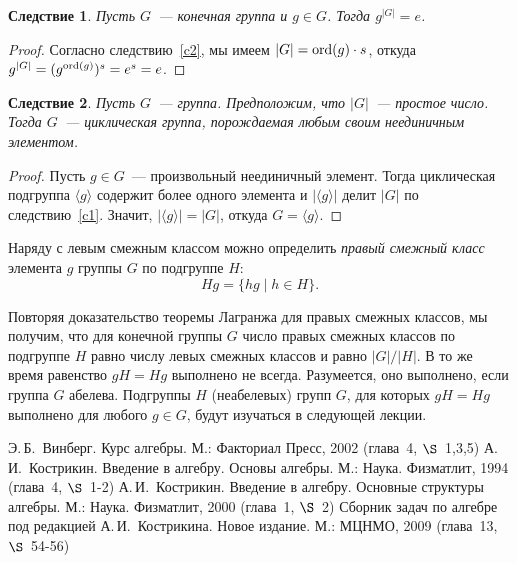 \documentclass[a4paper,10pt]{amsart}
\def\ord{{\rm ord}}%
\def\ord{{\rm ord}}
\def\ord{{\rm ord}}
\newtheorem{corollary}{Следствие}
\theoremstyle{definition}
\theoremstyle{remark}
\begin{document}
\begin{corollary} \label{c3}
Пусть $G$~--- конечная группа и $g\in G$. Тогда $g^{|G|}=e$.
\end{corollary}

\begin{proof}
Согласно следствию~\ref{c2}, мы имеем $|G|=\ord(g) \cdot s$, откуда
$g^{|G|}=(g^{\ord(g)})^s=e^s=e$.
\end{proof}

\begin{corollary} \label{c5}
Пусть $G$~--- группа. Предположим, что $|G|$~--- простое число.
Тогда $G$~--- циклическая группа, порождаемая любым своим
неединичным элементом.
\end{corollary}

\begin{proof}
Пусть $g\in G$~--- произвольный неединичный элемент. Тогда
циклическая подгруппа $\langle g\rangle$ содержит более одного
элемента и $|\langle g\rangle|$ делит $|G|$ по следствию~\ref{c1}.
Значит, $|\langle g\rangle|=|G|$, откуда $G=\langle g\rangle$.
\end{proof}

Наряду с левым смежным классом можно определить {\it правый смежный
класс} элемента $g$ группы $G$ по подгруппе $H$:
$$
Hg=\{hg \mid h\in H\}.
$$

Повторяя доказательство теоремы Лагранжа для правых смежных классов,
мы получим, что для конечной группы $G$ число правых смежных классов
по подгруппе $H$ равно числу левых смежных классов и равно
$|G|/|H|$. В то же время равенство $gH=Hg$ выполнено не всегда.
Разумеется, оно выполнено, если группа $G$ абелева. Подгруппы $H$
(неабелевых) групп $G$, для которых $gH=Hg$ выполнено для любого
$g\in G$, будут изучаться в следующей лекции.

\bigskip

\begin{thebibliography}{99}
Э.\,Б.~Винберг. Курс алгебры. М.: Факториал Пресс, 2002 (глава~4,
$\S$~1,3,5)
А.\,И.~Кострикин. Введение в алгебру. Основы алгебры. М.: Наука.
Физматлит, 1994 (глава~4, $\S$~1-2)
А.\,И.~Кострикин. Введение в алгебру. Основные структуры алгебры.
М.: Наука. Физматлит, 2000 (глава~1, $\S$~2)
Сборник задач по алгебре под редакцией А.\,И.~Кострикина. Новое
издание. М.: МЦНМО, 2009 (глава~13, $\S$~54-56)
\end{thebibliography}
\end{document}
